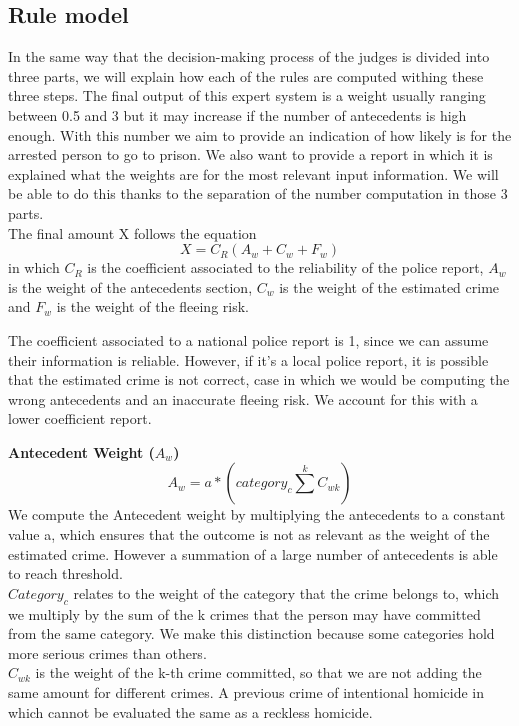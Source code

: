 \documentclass{article}
\begin{document}
\subsection{Rule model}
In the same way that the decision-making process of the judges is divided into three parts, we will explain how each of the rules are computed withing these three steps. The final output of this expert system is a weight usually ranging between 0.5 and 3 but it may increase if the number of antecedents is high enough. With this number we aim to provide an indication of how likely is for the arrested person to go to prison. We also want to provide a report in which it is explained what the weights are for the most relevant input information. We will be able to do this thanks to the separation of the number computation in those 3 parts. \\
The final amount X follows the equation 
\begin{equation}
    X = C_R(A_w+ C_w+F_w)
\end{equation}
in which $C_R$ is the coefficient associated to the reliability of the police report, $A_w$ is the weight of the antecedents section, $C_w$ is the weight of the estimated crime and $F_w$ is the weight of the fleeing risk.

The coefficient associated to a national police report is 1, since we can assume their information is reliable. However, if it's a local police report, it is possible that the estimated crime is not correct, case in which we would be computing the wrong antecedents and an inaccurate fleeing risk. We account for this with a lower coefficient report.

\textbf{Antecedent Weight ($A_w$)}
\begin{equation}
    A_w= a * (category_c \sum^{k} C_{wk})
\end{equation}
We compute the Antecedent weight by multiplying the antecedents to a constant value a, which ensures that the outcome is not as relevant as the weight of the estimated crime. However a summation of a large number of antecedents is able to reach threshold.\\
$Category_c$ relates to the weight of the category that the crime belongs to, which we multiply by the sum of the k crimes that the person may have committed from the same category. We make this distinction because some categories hold more serious crimes than others. \\
$C_{wk}$ is the weight of the k-th crime committed, so that we are not adding the same amount for different crimes. A previous crime of intentional homicide in which cannot be evaluated the same as a reckless homicide. 
\end{document}
